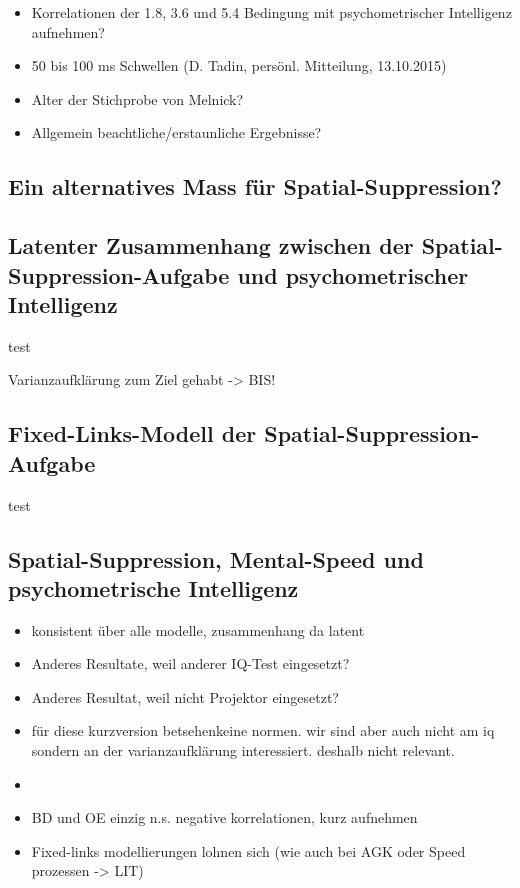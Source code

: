 \documentclass[11pt, twoside, a4paper]{book}		%
\begin{document}
\begin{itemize}
	\item Korrelationen der 1.8, 3.6 und 5.4 Bedingung mit psychometrischer Intelligenz aufnehmen?
	\item 50 bis 100 ms Schwellen (D. Tadin, persönl. Mitteilung, 13.10.2015)
	\item Alter der Stichprobe von Melnick?
	\item Allgemein beachtliche/erstaunliche Ergebnisse?
\end{itemize}



\subsection{Ein alternatives Mass für Spatial-Suppression?}






\subsection{Latenter Zusammenhang zwischen der Spatial-Sup\-pres\-sion-Auf\-gabe und psychometrischer Intelligenz}

test

Varianzaufklärung zum Ziel gehabt -> BIS!

\subsection{Fixed-Links-Modell der Spatial-Suppression-Aufgabe}

test

\subsection{Spatial-Suppression, Mental-Speed und psychometrische Intelligenz}



\begin{itemize}
	\item konsistent über alle modelle, zusammenhang da latent
	\item Anderes Resultate, weil anderer IQ-Test eingesetzt?
	\item Anderes Resultat, weil nicht Projektor eingesetzt?
	\item für diese kurzversion betsehenkeine normen. wir sind aber auch nicht am iq sondern an der varianzaufklärung interessiert. deshalb nicht relevant.
	\item 
	\item BD und OE einzig n.s. negative korrelationen, kurz aufnehmen
	\item Fixed-links modellierungen lohnen sich (wie auch bei AGK oder Speed prozessen -> LIT)
\end{itemize}
\end{document}
